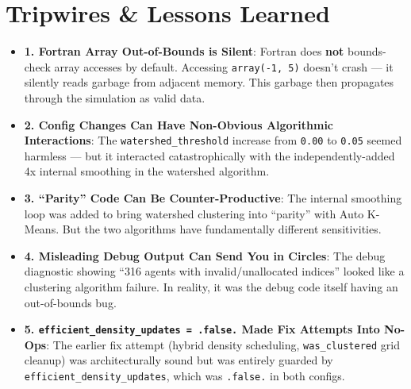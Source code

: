 \section{Tripwires \& Lessons Learned}
\begin{itemize}
\item \textbf{1. Fortran Array Out-of-Bounds is Silent}:
Fortran does \textbf{not} bounds-check array accesses by default. Accessing \texttt{array(-1, 5)} doesn't crash --- it silently reads garbage from adjacent memory. This garbage then propagates through the simulation as valid data.
\item \textbf{2. Config Changes Can Have Non-Obvious Algorithmic Interactions}:
The \texttt{watershed\_threshold} increase from \texttt{0.00} to \texttt{0.05} seemed harmless --- but it interacted catastrophically with the independently-added 4x internal smoothing in the watershed algorithm.
\item \textbf{3. ``Parity'' Code Can Be Counter-Productive}:
The internal smoothing loop was added to bring watershed clustering into ``parity'' with Auto K-Means. But the two algorithms have fundamentally different sensitivities.
\item \textbf{4. Misleading Debug Output Can Send You in Circles}:
The debug diagnostic showing ``316 agents with invalid/unallocated indices'' looked like a clustering algorithm failure. In reality, it was the debug code itself having an out-of-bounds bug.
\item \textbf{5. \texttt{efficient\_density\_updates = .false.} Made Fix Attempts Into No-Ops}:
The earlier fix attempt (hybrid density scheduling, \texttt{was\_clustered} grid cleanup) was architecturally sound but was entirely guarded by \texttt{efficient\_density\_updates}, which was \texttt{.false.} in both configs.
\end{itemize}